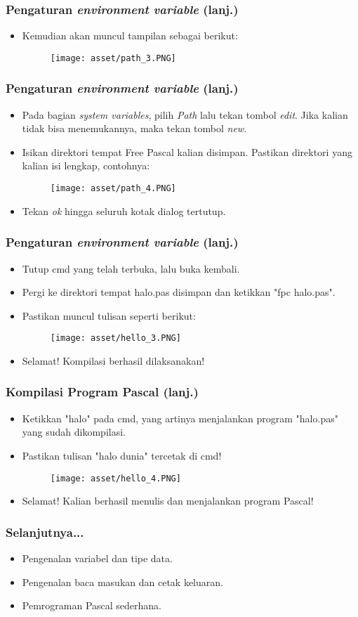 \documentclass{beamer}
\begin{document}
\begin{frame}
\frametitle{Pengaturan \textit{environment variable} (lanj.)}
\begin{itemize}
	\item Kemudian akan muncul tampilan sebagai berikut:
	\begin{figure}
		\texttt{[image: asset/path\_3.PNG]}
	\end{figure}
\end{itemize}
\end{frame}

\begin{frame}
\frametitle{Pengaturan \textit{environment variable} (lanj.)}
\begin{itemize}
	\item Pada bagian \textit{system variables}, pilih \textit{Path} lalu tekan tombol \textit{edit}. Jika kalian tidak bisa menemukannya, maka tekan tombol \textit{new}.
	\item Isikan direktori tempat Free Pascal kalian disimpan. Pastikan direktori yang kalian isi lengkap, contohnya:
	\begin{figure}
		\texttt{[image: asset/path\_4.PNG]}
	\end{figure}
	\item Tekan \textit{ok} hingga seluruh kotak dialog tertutup.
\end{itemize}
\end{frame}

\begin{frame}
\frametitle{Pengaturan \textit{environment variable} (lanj.)}
\begin{itemize}
	\item Tutup cmd yang telah terbuka, lalu buka kembali.
	\item Pergi ke direktori tempat halo.pas disimpan dan ketikkan "fpc halo.pas".
	\item Pastikan muncul tulisan seperti berikut:
	\begin{figure}
		\texttt{[image: asset/hello\_3.PNG]}
	\end{figure}
	\item Selamat! Kompilasi berhasil dilaksanakan!
\end{itemize}
\end{frame}

\begin{frame}
\frametitle{Kompilasi Program Pascal (lanj.)}
\begin{itemize}
	\item Ketikkan "halo" pada cmd, yang artinya menjalankan program "halo.pas" yang sudah dikompilasi.
	\item Pastikan tulisan "halo dunia" tercetak di cmd!
	\begin{figure}
		\texttt{[image: asset/hello\_4.PNG]}
	\end{figure}
	\item Selamat! Kalian berhasil menulis dan menjalankan program Pascal!
\end{itemize}
\end{frame}

\begin{frame}
\frametitle{Selanjutnya...}
\begin{itemize}
	\item Pengenalan variabel dan tipe data.
	\item Pengenalan baca masukan dan cetak keluaran.
	\item Pemrograman Pascal sederhana.
\end{itemize}
\end{frame}
\end{document}
